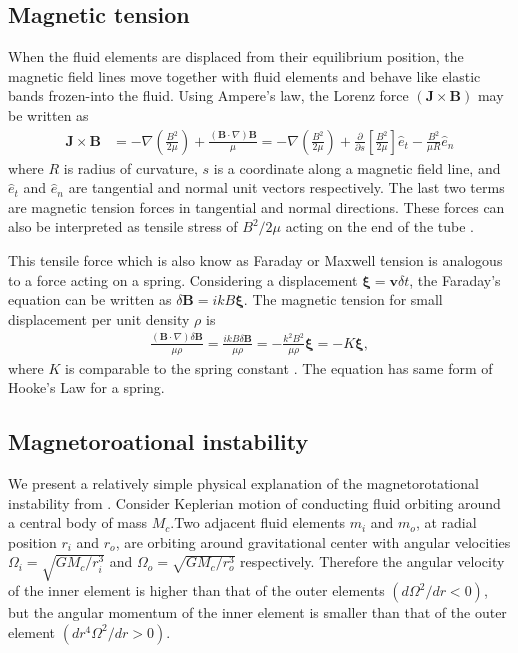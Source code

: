 \documentclass{jfm}
\newcommand{\del}{\nabla}
\begin{document}
%
%
\subsection{Magnetic tension}

When the fluid elements are displaced from their equilibrium position, the 
magnetic field lines move together with fluid elements and behave like elastic
bands frozen-into the fluid. Using Ampere's law, the Lorenz force 
$(\mathbf{J}\times\mathbf{B})$ may be written as
\begin{align}
    \mathbf{J}\times\mathbf{B} &= - \del\left(\frac{B^2}{2\mu}\right) +\frac{(\mathbf{B}\cdot \del)\mathbf{B}}{\mu}
    =- \del\left(\frac{B^2}{2\mu}\right)+\frac{\partial}{\partial s} \left[\frac{B^2}{2\mu}\right]\hat{e}_t - \frac{B^2}{\mu R}\hat{e}_n
\end{align} 
where $R$ is radius of curvature, $s$ is a coordinate along a magnetic 
field line, and $\hat{e}_t$ and $\hat{e}_n$ are tangential and normal unit vectors 
respectively. The last two terms are magnetic tension forces in tangential and 
normal directions. These forces can also be interpreted as tensile stress of 
$B^2/2\mu$ acting on the end of the tube \cite[see][]{Davidson2001}. 

This tensile force which is also know as Faraday or Maxwell tension is 
analogous to a force acting on a spring. Considering a displacement 
$\boldsymbol{\xi}=\mathbf{v}\delta t$, the Faraday's equation can be written 
as $\delta \mathbf{B} = ikB\boldsymbol{\xi}$. The magnetic tension for small 
displacement per unit density $\rho$ is
\begin{align}
    \frac{(\mathbf{B}\cdot\del)\delta \mathbf{B}}{\mu \rho}=\frac{ikB\delta \mathbf{B}}{\mu \rho} = -\frac{k^2 B^2}{\mu\rho} \boldsymbol{\xi} = -K \boldsymbol{\xi},
\end{align}
where $K$ is comparable to the spring constant \cite[see][]{Wiki:MRI,Balbus1998}. The 
equation has same form of Hooke's Law for a spring.


%
%
\subsection{Magnetoroational instability}
We present a relatively simple physical explanation of the magnetorotational 
instability from \cite{Balbus2011}. Consider Keplerian motion of conducting 
fluid orbiting around a central body of mass $M_c$.Two adjacent fluid elements 
$m_i$ and $m_o$, at radial position $r_i$ and $r_o$, are orbiting around 
gravitational center with angular velocities $\Omega_i=\sqrt{GM_c / r_i^{3}}$ 
and $\Omega_o=\sqrt{GM_c / r_o^{3}}$ respectively. Therefore the angular 
velocity of the inner element is higher than that of the outer elements 
$\left(d \Omega^2 / dr < 0 \right)$, but the angular momentum of the inner 
element is smaller than that of the outer element 
$\left(d r^4\Omega^2 / dr > 0 \right)$.
\end{document}
